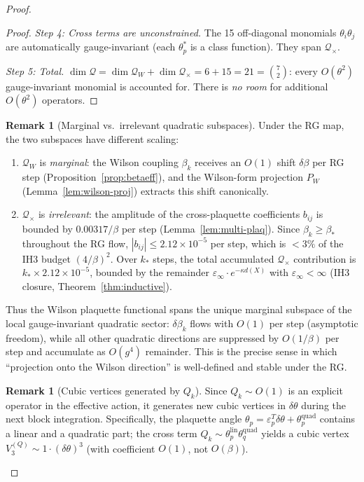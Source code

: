 \documentclass[11pt]{article}
\theoremstyle{definition}
\newtheorem{remark}[theorem]{Remark}
\begin{document}
\begin{proof}
\begin{proof}
\emph{Step 4: Cross terms are unconstrained.}
The 15 off-diagonal monomials $\theta_i\theta_j$ are
automatically gauge-invariant (each $\theta_p^*$ is a
class function).  They span $\mathcal{Q}_\times$.

\emph{Step 5: Total.}
$\dim\mathcal{Q}=\dim\mathcal{Q}_W+\dim\mathcal{Q}_\times
=6+15=21=\binom{7}{2}$: every $O(\theta^2)$ gauge-invariant
monomial is accounted for.  There is \emph{no room} for
additional $O(\theta^2)$ operators.
\end{proof}

\begin{remark}[Marginal vs.\ irrelevant quadratic
subspaces]\label{rem:marginal}
Under the RG map, the two subspaces have different scaling:
\begin{enumerate}[nosep,label=(\roman*)]
\item $\mathcal{Q}_W$ is \emph{marginal}: the Wilson coupling
$\beta_k$ receives an $O(1)$ shift $\delta\beta$ per RG step
(Proposition~\ref{prop:betaeff}), and the Wilson-form
projection $P_W$ (Lemma~\ref{lem:wilson-proj}) extracts this
shift canonically.
\item $\mathcal{Q}_\times$ is \emph{irrelevant}: the amplitude
of the cross-plaquette coefficients $b_{ij}$ is bounded by
$0.00317/\beta$ per step (Lemma~\ref{lem:multi-plaq}).
Since $\beta_k\ge\beta_*$ throughout the RG flow,
$|b_{ij}|\le 2.12\times 10^{-5}$ per step, which is $<3\%$
of the IH3 budget $(4/\beta)^2$.  Over $k_*$ steps, the total
accumulated $\mathcal{Q}_\times$ contribution is
$k_*\times 2.12\times 10^{-5}$, bounded by the remainder
$\varepsilon_\infty\cdot e^{-\kappa d(X)}$ with $\varepsilon_\infty<\infty$
(IH3 closure, Theorem~\ref{thm:inductive}).
\end{enumerate}
Thus the Wilson plaquette functional spans the unique marginal
subspace of the local gauge-invariant quadratic sector:
$\delta\beta_k$ flows with $O(1)$ per step (asymptotic freedom),
while all other quadratic directions are suppressed by
$O(1/\beta)$ per step and accumulate as $O(g^4)$ remainder.
This is the precise sense in which ``projection onto the
Wilson direction'' is well-defined and stable under the RG.
\end{remark}

\begin{remark}[Cubic vertices generated by $Q_k$]%
\label{rem:Qk-cubic}
Since $Q_k\sim O(1)$ is an explicit operator in the effective
action, it generates new cubic vertices in $\delta\theta$
during the next block integration.  Specifically, the plaquette
angle $\theta_p=\varepsilon_p^T\delta\theta+\theta_p^{\mathrm{quad}}$
contains a linear and a quadratic part; the cross term
$Q_k\sim\theta_p^{\mathrm{lin}}\theta_q^{\mathrm{quad}}$ yields
a cubic vertex $V_3^{(Q)}\sim 1\cdot(\delta\theta)^3$ (with
coefficient $O(1)$, not $O(\beta)$).


\end{remark}
\end{proof}
\end{document}
